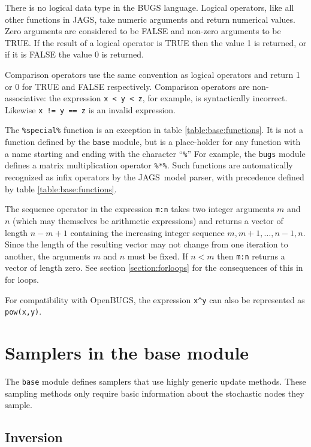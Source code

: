 \documentclass[11pt, a4paper, titlepage]{report}
\newcommand{\JAGS}{\textsf{JAGS}}
\begin{document}
There is no logical data type in the BUGS language.  Logical
operators, like all other functions in JAGS, take numeric arguments
and return numerical values. Zero arguments are considered to be FALSE and
non-zero arguments to be TRUE. If the result of a logical operator is
TRUE then the value 1 is returned, or if it is FALSE the value 0 is
returned.

Comparison operators use the same convention as logical operators and
return 1 or 0 for TRUE and FALSE respectively.  Comparison operators
are non-associative: the expression \verb+x < y < z+, for example, is
syntactically incorrect. Likewise \verb+x != y == z+ is an invalid
expression.

The \verb+%special%+ function is an exception in table
\ref{table:base:functions}. It is not a function defined by the
\verb+base+ module, but is a place-holder for any function with a name
starting and ending with the character ``\verb+%+'' For example, the
\texttt{bugs} module defines a matrix multiplication operator
\verb+%*%+. Such functions are automatically recognized as infix
operators by the \JAGS\ model parser, with precedence defined by table
\ref{table:base:functions}.

The sequence operator in the expression \verb+m:n+ takes two integer
arguments $m$ and $n$ (which may themselves be arithmetic expressions)
and returns a vector of length $n - m + 1$ containing the increasing
integer sequence $m, m+1, \ldots, n-1, n$. Since the length of the
resulting vector may not change from one iteration to another, the
arguments $m$ and $n$ must be fixed.  If $n < m$ then \verb+m:n+
returns a vector of length zero. See section \ref{section:forloops}
for the consequences of this in for loops.

For compatibility with OpenBUGS, the expression \verb+x^y+ can also be
represented as \texttt{pow(x,y)}.

\section{Samplers in the base module}

The \texttt{base} module defines samplers that use highly generic update
methods.  These sampling methods only require basic information about
the stochastic nodes they sample.  

\subsection{Inversion}
\end{document}
